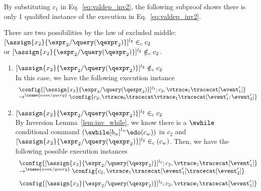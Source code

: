 \begin{subproof}
\[ \]
By substituting $c_1$ in Eq.~\ref{eq:valdep_inv2}, the following subproof shows there is only 1 qualified
 instance of the execution in Eq.~\ref{eq:valdep_inv2}.
\begin{subproof}[Subproof]
\label{pf:noiteration_inv2}
There are two possibilities by the law of excluded middle:
\\
$[\assign{{x}_2}{\expr_2 / \query(\qexpr_2)}]^{l_2} \in_c c_2$ 
\\
or $[\assign{{x}_2}{\expr_2 / \query(\qexpr_2)}]^{l_2} \notin_c c_2$.
%
\begin{enumerate}
\item{$[\assign{{x}_2}{\expr_2 / \query(\qexpr_2)}]^{l_2}\notin_c c_2$}
\\
In this case, we have the following execution instance
%
  \[
    \begin{array}{l}
  \config{[\assign{{x}_2}{\expr_2 / \query(\qexpr_2)}]^{l_2} ; {c}_2, \vtrace_1 \tracecat [\event_1']}
  \\ 
  \rightarrow^\rname{assn/query} 
  \config{{c}_2,  \vtrace_0 \tracecat \vtrace_1 \tracecat [\event_1'; \event_2']} 
    \end{array}
 \]
%
\item{$[\assign{{x}_2}{\expr_2 / \query(\qexpr_2)}]^{l_2} \in_c c_2$}
\\
By Inversion Lemma~\ref{lem:inv_while}, 
we know there is a $\ewhile$ conditional command
 $(\ewhile [b_w]^{l_w} \edo (c_w))$ in $c_2$ and
$[\assign{{x}_2}{\expr_2 / \query(\qexpr_2)}]^{l_2} \in_c (c_w)$.
Then, we have the following possible execution instances
  \[
    \begin{array}{l}
      \config{[\assign{{x}_2}{\expr_2 / \query(\qexpr_2)}]^{l_2} ; {c}_2, \vtrace_1 \tracecat [\event_1']} 
      \\ 
      \rightarrow^\rname{assn/query} 
      \config{{c}_2,  \vtrace_1 \tracecat [\event_1']\tracecat [\event_2']} 
\end{array}
\]
%
  \[
  \begin{array}{l}
  \config{[\assign{{x}_2}{\expr_2 / \query(\qexpr_2)}]^{l_2} ; {c}_2, \vtrace_1 \tracecat [\event_1']} 

\end{array}\]
\end{enumerate}
\end{subproof}
\end{subproof}
